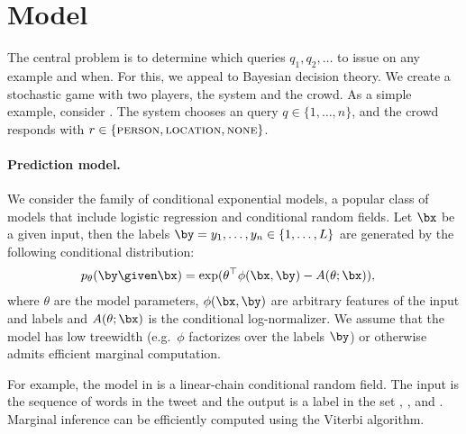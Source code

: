 \section{Model}
\label{sec:model}

The central problem is to determine which queries $q_1, q_2, \dots$ to issue on
any example and when.  For this, we appeal to Bayesian decision theory.
We create a stochastic game with two players, the system and the crowd.
As a simple example, consider .
The system chooses an query $q \in \{1, \dots, n\}$,
and the crowd responds with $r \in \{ \textsc{person}{}, \textsc{location}{}, \textsc{none}{} \}$.



\paragraph{Prediction model.}
We consider the family of conditional exponential models, a popular class of models that include logistic regression and conditional random fields.
Let $\bx$ be a given input, then the labels $\by = y_1, \ldots, y_n \in \{1, \dots, L\}$ are generated by the following conditional distribution:
\begin{align*}
  \p(\by \given \bx) 
  &= \exp( \theta^\top \phi(\bx, \by) - A(\theta; \bx)),
\end{align*}
where $\theta$ are the model parameters,
$\phi(\bx, \by)$ are arbitrary features of the input and labels and 
$A(\theta; \bx)$ is the conditional log-normalizer.
We assume that the model has low treewidth (e.g.\ $\phi$ factorizes over the labels $\by$) or otherwise admits efficient marginal computation.

For example, the model in  is a linear-chain conditional random field. The input is the sequence of words in the tweet and the output is a label in the set \scnone, \scres, \scloc{} and \scper. Marginal inference can be efficiently computed using the Viterbi algorithm.

